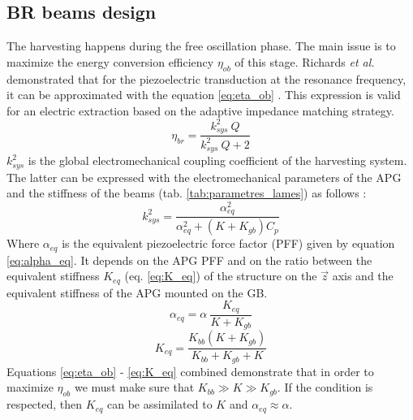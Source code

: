 \documentclass[3p,twocolumn,preprint]{elsarticle}
\begin{document}
	\subsection{BR beams design}	
	\label{subsec:BR beams design}
The harvesting happens during the free oscillation phase. The main issue is to maximize the energy conversion efficiency $\eta_{ob}$ of this stage. Richards \emph{et al.} demonstrated that for the piezoelectric transduction at the resonance frequency, it can be approximated with the equation \ref{eq:eta_ob} \cite{Richards2004}. This expression is valid for an electric extraction based on the adaptive impedance matching strategy.
\begin{equation}
	\eta_{br} = \dfrac{k^2_{sys}\ Q}{k^2_{sys}\ Q + 2}
	\label{eq:eta_ob}
\end{equation}
$k^2_{sys}$ is the global electromechanical coupling coefficient of the harvesting system. The latter can be expressed with the electromechanical parameters of the APG and the stiffness of the beams (tab. \ref{tab:parametres_lames}) as follows :
\begin{equation}
	k^2_{sys} = \dfrac{\alpha^2_{eq}}{\alpha^2_{eq} + (K+K_{gb})C_p}
	\label{eq:k2_sys}
\end{equation}
Where $\alpha_{eq}$ is the equivalent piezoelectric force factor (PFF) given by equation \ref{eq:alpha_eq}. It depends on the APG PFF and on the ratio between the equivalent stiffness $K_{eq}$ (eq. \ref{eq:K_eq}) of the structure on the $\vec{z}$ axis and the equivalent stiffness of the APG mounted on the GB.
\begin{equation}
	\alpha_{eq} = \alpha\ \dfrac{K_{eq}}{K + K_{gb}} 
	\label{eq:alpha_eq}
\end{equation}
\begin{equation}
	K_{eq} = \dfrac{K_{bb}(K + K_{gb})}{K_{bb} + K_{gb} + K}
	\label{eq:K_eq}
\end{equation}
Equations \ref{eq:eta_ob} - \ref{eq:K_eq} combined demonstrate that in order to maximize $\eta_{ob}$ we must make sure that $K_{bb} \gg K \gg K_{gb}$. If the condition is respected, then $K_{eq}$ can be assimilated to $K$ and $\alpha_{eq} \approx \alpha$.
\end{document}
